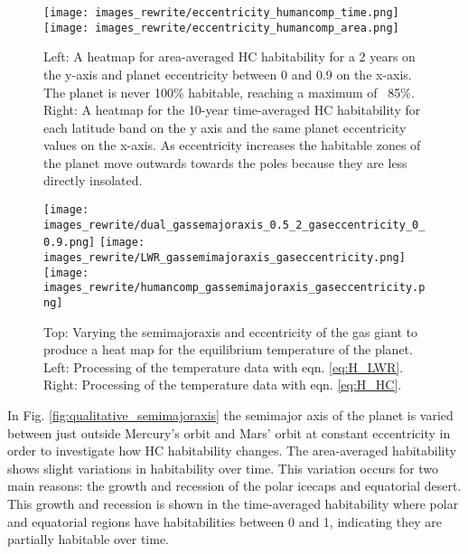 \documentclass[12pt, onecolumn]{revtex4-2}    %
\begin{document}
\begin{figure}
  \texttt{[image: images\_rewrite/eccentricity\_humancomp\_time.png]}
  \texttt{[image: images\_rewrite/eccentricity\_humancomp\_area.png]}
  \caption{
    Left: A heatmap for area-averaged HC habitability for a 2 years on the y-axis and planet eccentricity between $0$ and $0.9$ on the x-axis.
    The planet is never 100\% habitable, reaching a maximum of ~85\%.
    Right: A heatmap for the 10-year time-averaged HC habitability for each latitude band on the y axis and the same planet eccentricity values on the x-axis.
    As eccentricity increases the habitable zones of the planet move outwards towards the poles because they are less directly insolated.
  }
  \label{fig:qualitative_eccentricity}
\end{figure}

\begin{figure}
  \texttt{[image: images\_rewrite/dual\_gassemajoraxis\_0.5\_2\_gaseccentricity\_0\_0.9.png]}
  \texttt{[image: images\_rewrite/LWR\_gassemimajoraxis\_gaseccentricity.png]}
  \texttt{[image: images\_rewrite/humancomp\_gassemimajoraxis\_gaseccentricity.png]}
  \caption{
    Top: Varying the semimajoraxis and eccentricity of the gas giant to produce a heat map for the equilibrium temperature of the planet.
    Left: Processing of the temperature data with eqn. \eqref{eq:H_LWR}.
    Right: Processing of the temperature data with eqn. \eqref{eq:H_HC}.
  }
  \label{fig:qualitative_semimajoraxis_eccentricity}
\end{figure}

In Fig. \ref{fig:qualitative_semimajoraxis} the semimajor axis of the planet is varied between just outside Mercury's orbit and Mars' orbit at constant eccentricity in order to investigate how HC habitability changes.
The area-averaged habitability shows slight variations in habitability over time.
This variation occurs for two main reasons: the growth and recession of the polar icecaps and equatorial desert.
This growth and recession is shown in the time-averaged habitability where polar and equatorial regions have habitabilities between 0 and 1, indicating they are partially habitable over time.
\end{document}
